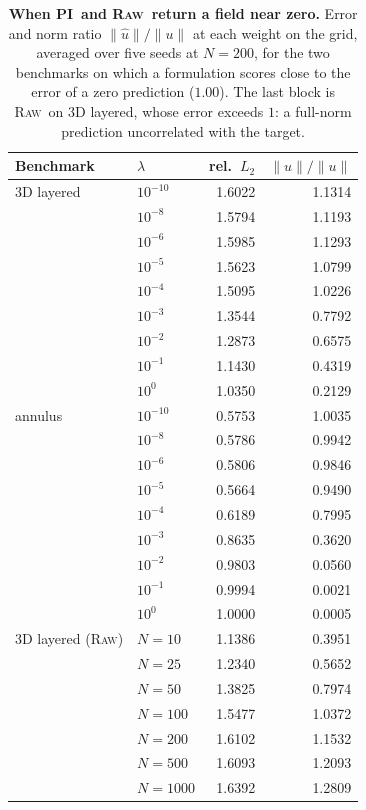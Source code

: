 \documentclass{article}
\newcommand{\armraw}{\textsc{Raw}}
\newcommand{\armpi}{\textsc{PI}}
\begin{document}
\begin{table}[t]
\centering
\caption{\textbf{When \armpi\ and \armraw\ return a field near zero.} Error and norm ratio
$\|\hat u\|/\|u\|$ at each weight on the grid, averaged over five seeds at $N=200$, for the two
benchmarks on which a formulation scores close to the error of a zero prediction ($1.00$). The last
block is \armraw\ on 3D layered, whose error exceeds $1$: a full-norm prediction uncorrelated with
the target.}
\label{tab:app-e1-collapse}
\footnotesize
\setlength{\tabcolsep}{22pt}
\renewcommand{\arraystretch}{0.7}
\begin{tabular}{llrr}
\toprule
Benchmark & $\lambda$ & rel.\ $L_2$ & $\|\hat u\|/\|u\|$\\
\midrule
3D layered & $10^{-10}$ & 1.6022 & 1.1314\\
 & $10^{-8}$ & 1.5794 & 1.1193\\
 & $10^{-6}$ & 1.5985 & 1.1293\\
 & $10^{-5}$ & 1.5623 & 1.0799\\
 & $10^{-4}$ & 1.5095 & 1.0226\\
 & $10^{-3}$ & 1.3544 & 0.7792\\
 & $10^{-2}$ & 1.2873 & 0.6575\\
 & $10^{-1}$ & 1.1430 & 0.4319\\
 & $10^{0}$ & 1.0350 & 0.2129\\
\addlinespace[2pt]
annulus & $10^{-10}$ & 0.5753 & 1.0035\\
 & $10^{-8}$ & 0.5786 & 0.9942\\
 & $10^{-6}$ & 0.5806 & 0.9846\\
 & $10^{-5}$ & 0.5664 & 0.9490\\
 & $10^{-4}$ & 0.6189 & 0.7995\\
 & $10^{-3}$ & 0.8635 & 0.3620\\
 & $10^{-2}$ & 0.9803 & 0.0560\\
 & $10^{-1}$ & 0.9994 & 0.0021\\
 & $10^{0}$ & 1.0000 & 0.0005\\
\addlinespace[2pt]
3D layered (\armraw) & $N=10$ & 1.1386 & 0.3951\\
 & $N=25$ & 1.2340 & 0.5652\\
 & $N=50$ & 1.3825 & 0.7974\\
 & $N=100$ & 1.5477 & 1.0372\\
 & $N=200$ & 1.6102 & 1.1532\\
 & $N=500$ & 1.6093 & 1.2093\\
 & $N=1000$ & 1.6392 & 1.2809\\
\bottomrule
\end{tabular}
  \vspace{-3mm}
\end{table}
\end{document}
